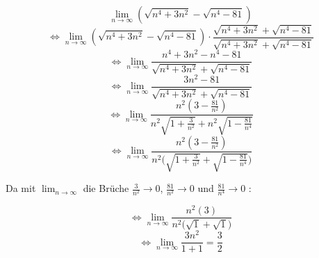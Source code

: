 \documentclass[a4paper,tikz]{article}
\begin{document}
\[ \lim_{n \rightarrow \infty} (\sqrt{n^4 + 3n^2} - \sqrt{n^4-81})\]
\[ \Longleftrightarrow \lim_{n \rightarrow \infty} (\sqrt{n^4 + 3n^2} - \sqrt{n^4-81}) \cdot \frac{\sqrt{n^4 + 3n^2} + \sqrt{n^4-81}}{\sqrt{n^4 + 3n^2} + \sqrt{n^4-81}}\]
\[ \Longleftrightarrow \lim_{n \rightarrow \infty} \frac{n^4+3n^2-n^4-81}{\sqrt{n^4 + 3n^2} + \sqrt{n^4-81}}\]
\[ \Longleftrightarrow \lim_{n \rightarrow \infty} \frac{3n^2-81}{\sqrt{n^4 + 3n^2} + \sqrt{n^4-81}}\]
\[ \Longleftrightarrow \lim_{n \rightarrow \infty} \frac{n^2(3-\frac{81}{n^2})}{n^2\sqrt{1+ \frac{3}{n^2}} + n^2 \sqrt{1-\frac{81}{n^4}}}\]
\[ \Longleftrightarrow \lim_{n \rightarrow \infty} \frac{n^2(3-\frac{81}{n^2})}{n^2 \bigg( \sqrt{1+ \frac{3}{n^2}} + \sqrt{1-\frac{81}{n^4}} \bigg) }\]

Da mit $\lim_{n \rightarrow \infty}$ die Brüche $\frac{3}{n^2} \rightarrow 0$, $\frac{81}{n^2} \rightarrow 0$ und $\frac{81}{n^4} \rightarrow 0$ :

\[ \Longleftrightarrow \lim_{n \rightarrow \infty} \frac{n^2(3)}{n^2 \big( \sqrt{1} + \sqrt{1} \big) }\]
\[ \Longleftrightarrow \lim_{n \rightarrow \infty} \frac{3{n^2}}{1 + 1} = \frac{3}{2}\]
\end{document}
